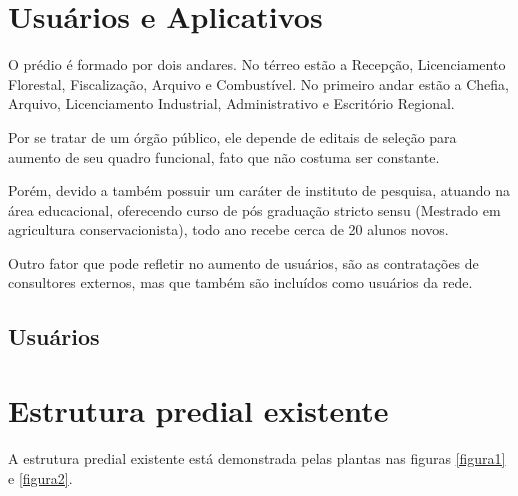\documentclass[	DIV=calc,%
							paper=a4,%
							fontsize=12pt,%
							onecolumn]{scrartcl}	 					%
\begin{document}
\section{Usuários e Aplicativos}
O prédio é formado por dois andares. No térreo estão a Recepção, Licenciamento Florestal, Fiscalização, Arquivo e Combustível. No primeiro andar estão a Chefia, Arquivo, Licenciamento Industrial, Administrativo e Escritório Regional.\par
Por se tratar de um órgão público, ele depende de editais de seleção para aumento de seu quadro funcional, fato que não costuma ser constante.\par
Porém, devido a também possuir um caráter de instituto de pesquisa, atuando na área educacional, oferecendo curso de pós graduação stricto sensu (Mestrado em agricultura conservacionista), todo ano recebe cerca de 20 alunos novos.\par
Outro fator que pode refletir no aumento de usuários, são as contratações de consultores externos, mas que também são incluídos como usuários da rede.

\subsection{Usuários}



\section{Estrutura predial existente}
A estrutura predial existente está demonstrada pelas plantas nas figuras \ref{figura1} e \ref{figura2}.
\end{document}

